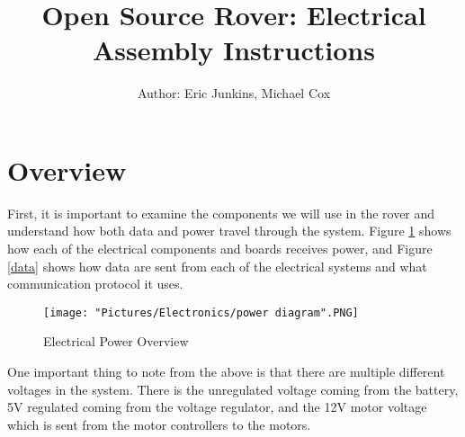 \documentclass[12pt]{article}
\begin{document}
\title{Open Source Rover: Electrical Assembly Instructions}
\author{Author: Eric Junkins, Michael Cox}

\makeatletter         
\def\@maketitle{
\begin{center}	
	\makebox[\textwidth][c]{ \texttt{[image: "Pictures/Electronics/electronics title".png]}}
	{\Huge \bfseries \sffamily \@title }\\[3ex] 
	{\Large \sffamily \@author}\\[3ex] 
	\texttt{[image: "Pictures/Electronics/JPL logo".png]}
\end{center}}
\makeatother

\maketitle



\newpage


\tableofcontents

\newpage

\section{Overview}

First, it is important to examine the components we will use in the rover and understand how both data and power travel through the system. Figure \ref{power} shows how each of the electrical components and boards receives power, and Figure \ref{data} shows how data are sent from each of the electrical systems and what communication protocol it uses. 
\begin{figure}[H]
  	\centering
    	\texttt{[image: "Pictures/Electronics/power diagram".PNG]}
  	\caption{Electrical Power Overview}
	\label{power}
\end{figure}

\noindent One important thing to note from the above is that there are multiple different voltages in the system. There is the unregulated voltage coming from the battery, 5V regulated coming from the voltage regulator, and the 12V motor voltage which is sent from the motor controllers to the motors. 
\end{document}
